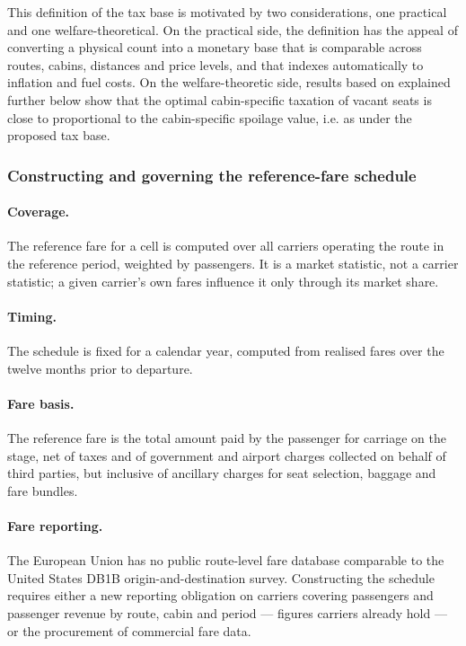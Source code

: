 \documentclass[../../main]{subfiles}
\begin{document}
This definition of the tax base is motivated by two considerations, one practical and one welfare-theoretical. On the practical side, the definition has the appeal of converting a physical count into a monetary base that is comparable across routes, cabins, distances and price levels, and that indexes automatically to inflation and fuel costs. On the welfare-theoretic side, results based on \citet{Dörpinghaus_et_al_2026} explained further below show 
that the optimal cabin-specific taxation of vacant seats is close to proportional to the cabin-specific spoilage value, i.e. as under the proposed tax base.

\subsubsection{Constructing and governing the reference-fare schedule}
\paragraph{Coverage.} The reference fare for a cell is computed over all carriers operating the route in the reference period, weighted by passengers. It is a market statistic, not a carrier statistic; a given carrier's own fares influence it only through its market share.

\paragraph{Timing.} The schedule is fixed for a calendar year, computed from realised fares over the twelve months prior to departure. 

\paragraph{Fare basis.} The reference fare is the total amount paid by the passenger for carriage on the stage, net of taxes and of government and airport charges collected on behalf of third parties, but inclusive of ancillary charges for seat selection, baggage and fare bundles.

\paragraph{Fare reporting.} The European Union has no public route-level fare database comparable to the United States DB1B origin-and-destination survey. Constructing the schedule requires either a new reporting obligation on carriers covering passengers and passenger revenue by route, cabin and period --- figures carriers already hold --- or the procurement of commercial fare data. 
\end{document}
